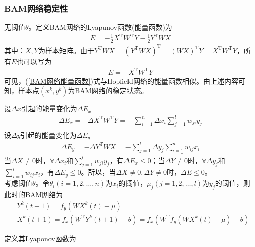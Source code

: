 {        \subsubsection{BAM网络稳定性}
            \par
            无阈值$\theta$。定义BAM网络的Lyapunov函数(能量函数)为
            \begin{align*}
            E = -\frac{1}{2}X^\mathrm{T}W^\mathrm{T} Y - \frac{1}{2}Y^\mathrm{T}WX
            \end{align*}
            其中：$X,Y$为样本矩阵。由于$Y^\mathrm{T}WX = (Y^\mathrm{T}WX)^\mathrm{T} = (WX)^\mathrm{T}Y = X^\mathrm{T}W^\mathrm{T}Y$，所有$E$也可以写为
            \begin{align}
            \label{BAM网络能量函数}
            E = -X^\mathrm{T}W^\mathrm{T}Y
            \end{align}
            可见，(\ref{BAM网络能量函数})式与Hopfield网络的能量函数相似。由上述内容可知，样本点$(x^k,y^k)$为BAM网络的稳定状态。
            \par
            设$\Delta x$引起的能量变化为$\Delta E_x$
            \begin{align*}
            \Delta E_x = -\Delta X^\mathrm{T}W^\mathrm{T}Y = -\sum_{i=1}^n \Delta x_i \underline{\sum_{j=1}^l w_{ji}y_j}
            \end{align*}
            设$\Delta y$引起的能量变化为$\Delta E_y$
            \begin{align*}
            \Delta E_y = -\Delta Y^\mathrm{T}WX = -\sum_{j=1}^l \Delta y_j \underline{\sum_{i=1}^n w_{ij}x_i}
            \end{align*}
            当$\Delta X \neq 0$时，$\forall \Delta x_i$和$\sum\limits_{j=1}^l w_{ji}y_j$，有$\Delta E_x \leqslant 0$；当$\Delta Y \neq 0$时，$\forall \Delta y_j$和$\sum\limits_{i=1}^l w_{ij}x_i$，有$\Delta E_y \leqslant 0$。所以，当$\Delta X \neq 0,\Delta Y \neq 0$时，$\Delta E \leqslant 0$。\\
            考虑阈值$\theta$。令$\theta_i(i=1,2,\dots,n)$为$x_i$的阈值，$\mu_j(j=1,2,\dots,l)$为$y_j$的阈值，则此时的BAM网络为
            \begin{align*}
            & Y^k(t+1) = f_y(W X^k(t) - \mu)\\
            & X^k(t+1) = f_x(W^\mathrm{T}Y^k(t+1) - \theta) = f_x(W^\mathrm{T}f_y(WX^k(t)-\mu)-\theta)
            \end{align*}
            \par
            定义其Lyaponov函数为
            \begin{align*}

\end{align*}}
